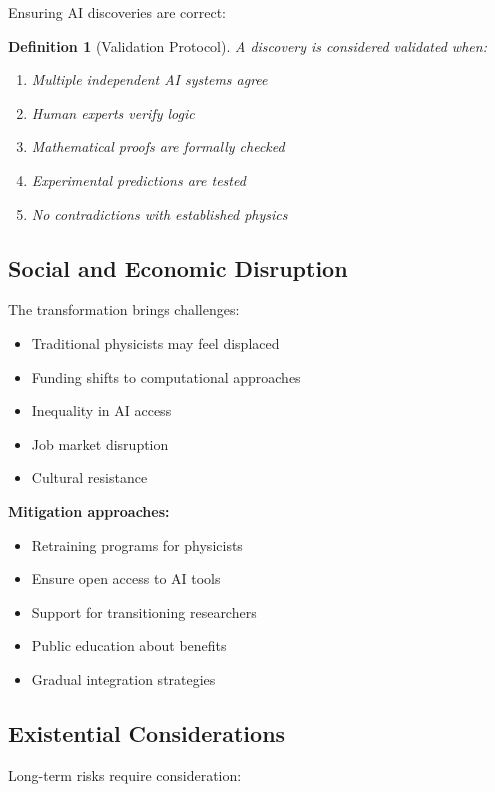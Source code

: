 \documentclass[11pt,a4paper]{article}
\newtheorem{definition}[theorem]{Definition}
\begin{document}
Ensuring AI discoveries are correct:

\begin{definition}[Validation Protocol]
A discovery is considered validated when:
\begin{enumerate}
    \item Multiple independent AI systems agree
    \item Human experts verify logic
    \item Mathematical proofs are formally checked
    \item Experimental predictions are tested
    \item No contradictions with established physics
\end{enumerate}
\end{definition}

\subsection{Social and Economic Disruption}

The transformation brings challenges:

\begin{itemize}
    \item Traditional physicists may feel displaced
    \item Funding shifts to computational approaches
    \item Inequality in AI access
    \item Job market disruption
    \item Cultural resistance
\end{itemize}

\textbf{Mitigation approaches:}
\begin{itemize}
    \item Retraining programs for physicists
    \item Ensure open access to AI tools
    \item Support for transitioning researchers
    \item Public education about benefits
    \item Gradual integration strategies
\end{itemize}

\subsection{Existential Considerations}

Long-term risks require consideration:
\end{document}
